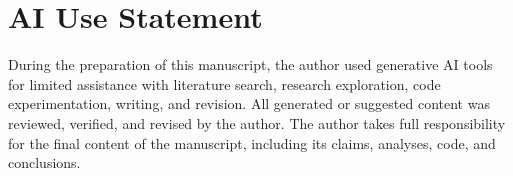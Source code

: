\section*{AI Use Statement}
During the preparation of this manuscript, the author used generative AI tools for limited assistance with literature search, research exploration, code experimentation, writing, and revision. All generated or suggested content was reviewed, verified, and revised by the author. The author takes full responsibility for the final content of the manuscript, including its claims, analyses, code, and conclusions.
